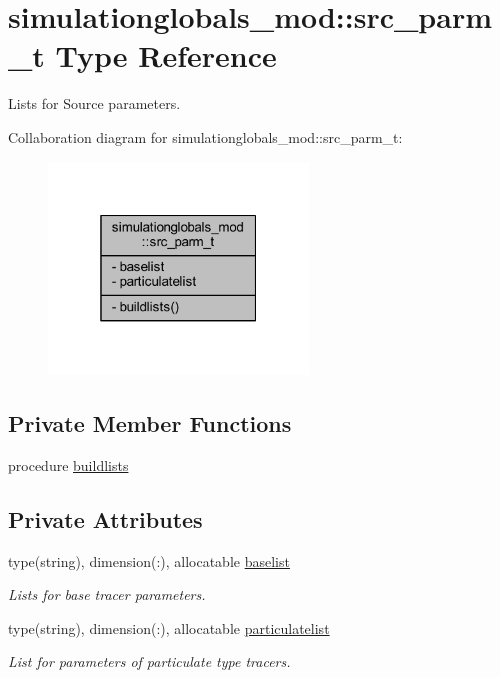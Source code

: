 \hypertarget{structsimulationglobals__mod_1_1src__parm__t}{}\section{simulationglobals\+\_\+mod\+:\+:src\+\_\+parm\+\_\+t Type Reference}
\label{structsimulationglobals__mod_1_1src__parm__t}


Lists for Source parameters.  




Collaboration diagram for simulationglobals\+\_\+mod\+:\+:src\+\_\+parm\+\_\+t\+:\nopagebreak
\begin{figure}[H]
\begin{center}
\leavevmode
\includegraphics[width=196pt]{structsimulationglobals__mod_1_1src__parm__t__coll__graph}
\end{center}
\end{figure}
\subsection*{Private Member Functions}
\begin{DoxyCompactItemize}
\item 
procedure \mbox{\hyperlink{structsimulationglobals__mod_1_1src__parm__t_a0dd15ea4d9d7bb28eb4bca8a3a4262f1}{buildlists}}
\end{DoxyCompactItemize}
\subsection*{Private Attributes}
\begin{DoxyCompactItemize}
\item 
type(string), dimension(\+:), allocatable \mbox{\hyperlink{structsimulationglobals__mod_1_1src__parm__t_ad17cf719066b0385f9e88a09ea61071b}{baselist}}
\begin{DoxyCompactList}\small\item\em Lists for base tracer parameters. \end{DoxyCompactList}\item 
type(string), dimension(\+:), allocatable \mbox{\hyperlink{structsimulationglobals__mod_1_1src__parm__t_acc2c392a2031552a1f44336a4ca96873}{particulatelist}}
\begin{DoxyCompactList}\small\item\em List for parameters of particulate type tracers. \end{DoxyCompactList}\end{DoxyCompactItemize}


